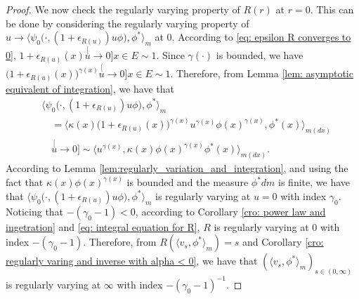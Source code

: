 \documentclass[12pt,a4paper]{amsart}
\theoremstyle{definition}
\numberwithin{equation}{section}
\begin{document}
\begin{proof}
We now check the regularly varying property of $R(r)$ at $r=0$.
This can be done by considering the regularly varying property of $u\to \big\langle \psi_0 \big(\cdot ,( 1 + \epsilon_{R(u)} ) u \phi \big), \phi^* \big\rangle_m$ at 0.
According to \eqref{eq: epsilon R converges to 0},  $1+ \epsilon_{R(u)}(x) \stackrel[u\to 0]{x\in E}{\sim} 1$.
Since $\gamma(\cdot)$ is bounded, we have $\big(1+ \epsilon_{R(u)}(x)\big)^{\gamma(x)}\stackrel[u\to 0]{x\in E}{\sim} 1$.
Therefore, from Lemma \ref{lem: asymptotic equivalent of integration}, we have that
\begin{align}\label{eq: regularly part in the integration}
	&\big\langle \psi_0 \big(\cdot,( 1 + \epsilon_{R(u)} ) u \phi \big), \phi^* \big\rangle_m
	\\&\quad = \big\langle \kappa (x)\big( 1 + \epsilon_{R(u)}(x)\big )^{\gamma(x)} u^{\gamma(x)} \phi(x)^{\gamma(x)} , \phi^*(x) \big\rangle_{m(dx)}
	\\ &\quad \stackrel[u\to 0]{}{\sim} \langle u^{\gamma(x)} , \kappa (x)\phi(x)^{\gamma(x)} \phi^*(x) \rangle_{m(dx)}.
\end{align}
According to Lemma \ref{lem:regularly_variation_and_integration}, and using the fact that $\kappa(x)\phi(x)^{\gamma(x)}$ is bounded and the measure $\phi^* dm$ is finite, we have that $\langle \psi_0\big(\cdot,(1+\epsilon_{R(u)})u\phi \big), \phi^* \rangle_m$ is regularly varying at $u = 0$ with index $\gamma_0$.
Noticing that $-(\gamma_0 - 1) < 0$, according to Corollary \ref{cro: power law and ingetration} and \eqref{eq: integral equation for R}, $R$ is regularly varying at $0$ with index $-(\gamma_0 - 1)$.
Therefore, from $R(\langle v_s, \phi^*\rangle_m) = s$ and Corollary \ref{cro: regularly varing and inverse with alpha < 0}, we have that $(\langle v_s, \phi^*\rangle_m)_{s\in (0,\infty)}$ is regularly varying at $\infty$ with index $-(\gamma_0 - 1)^{-1}$.
	

\end{proof}
\end{document}
